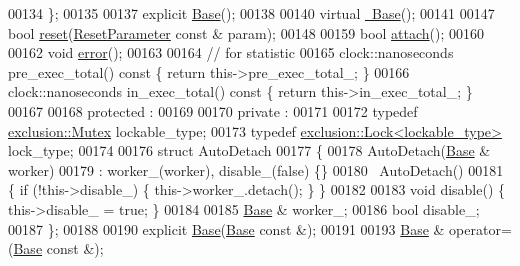 \begin{DoxyCode}
00134     \};
00135 
00137     \textcolor{keyword}{explicit} \hyperlink{classhryky_1_1task_1_1worker_1_1_base_a5ffe0568374d8b9b4c4ec32953fd6453}{Base}();
00138 
00140     \textcolor{keyword}{virtual} \hyperlink{classhryky_1_1task_1_1worker_1_1_base_a722da881b6c70cfcbde9243abcfbf334}{~Base}();
00141 
00147     \textcolor{keywordtype}{bool} \hyperlink{classhryky_1_1task_1_1worker_1_1_base_a2dfa3093b3165d58ed31aa575ae1b159}{reset}(\hyperlink{structhryky_1_1task_1_1worker_1_1_base_1_1_reset_parameter}{ResetParameter} \textcolor{keyword}{const} & param);
00148 
00159     \textcolor{keywordtype}{bool} \hyperlink{classhryky_1_1task_1_1worker_1_1_base_ae17d5723d8aa5567ea6a47b67f8133c4}{attach}();
00160 
00162     \textcolor{keywordtype}{void} \hyperlink{classhryky_1_1task_1_1worker_1_1_base_aa39b31ced492faec5dd3b6478b0a98df}{error}();
00163 
00164     \textcolor{comment}{// for statistic}
00165     clock::nanoseconds  pre\_exec\_total()\textcolor{keyword}{ const }\{ \textcolor{keywordflow}{return} this->pre\_exec\_total\_; 
      \}
00166     clock::nanoseconds  in\_exec\_total()\textcolor{keyword}{ const }\{ \textcolor{keywordflow}{return} this->in\_exec\_total\_; \}
00167 
00168 \textcolor{keyword}{protected} :
00169 
00170 \textcolor{keyword}{private} :
00171 
00172     \textcolor{keyword}{typedef} \hyperlink{classhryky_1_1exclusion_1_1_mutex}{exclusion::Mutex}                lockable\_type;
00173     \textcolor{keyword}{typedef} \hyperlink{classhryky_1_1exclusion_1_1_lock}{exclusion::Lock<lockable_type>}  lock\_type;
00174 
00176     \textcolor{keyword}{struct }AutoDetach
00177     \{
00178         AutoDetach(\hyperlink{classhryky_1_1task_1_1worker_1_1_base_a5ffe0568374d8b9b4c4ec32953fd6453}{Base} & worker)
00179             : worker\_(worker), disable\_(false) \{\}
00180         ~AutoDetach()
00181         \{ \textcolor{keywordflow}{if} (!this->disable\_) \{ this->worker\_.detach(); \} \}
00182 
00183         \textcolor{keywordtype}{void} disable() \{ this->disable\_ = \textcolor{keyword}{true}; \}
00184 
00185         \hyperlink{classhryky_1_1task_1_1worker_1_1_base_a5ffe0568374d8b9b4c4ec32953fd6453}{Base} & worker\_;
00186         \textcolor{keywordtype}{bool} disable\_;
00187     \};
00188 
00190     \textcolor{keyword}{explicit} \hyperlink{classhryky_1_1task_1_1worker_1_1_base_a5ffe0568374d8b9b4c4ec32953fd6453}{Base}(\hyperlink{classhryky_1_1task_1_1worker_1_1_base_a5ffe0568374d8b9b4c4ec32953fd6453}{Base} \textcolor{keyword}{const} &);
00191 
00193     \hyperlink{classhryky_1_1task_1_1worker_1_1_base_a5ffe0568374d8b9b4c4ec32953fd6453}{Base} & operator=(\hyperlink{classhryky_1_1task_1_1worker_1_1_base_a5ffe0568374d8b9b4c4ec32953fd6453}{Base} \textcolor{keyword}{const} &);

\end{DoxyCode}
